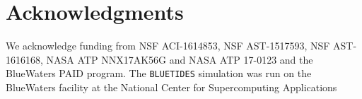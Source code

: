 \documentclass[a4paper,usenatbib]{mnras}
\begin{document}
\section*{Acknowledgments}
We acknowledge funding from NSF
ACI-1614853, NSF AST-1517593, NSF AST-1616168, NASA ATP NNX17AK56G and NASA ATP 17-0123 and the BlueWaters PAID program. The \texttt{BLUETIDES} simulation was run on the BlueWaters facility at the National Center for Supercomputing Applications















\bsp	%
\label{lastpage}
\end{document}
